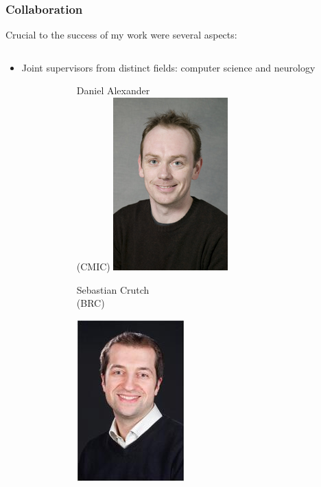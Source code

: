 \documentclass[10pt,xcolor=table]{beamer}
\begin{document}
\begin{frame}
\frametitle{Collaboration}

Crucial to the success of my work were several aspects:

\begin{small}
\begin{columns}[T]
    \begin{column}{.47\textwidth}

     \begin{itemize}
      \item Joint supervisors from distinct fields: computer science and neurology
      \begin{figure}
      \begin{subfigure}{0.42\textwidth}
      \centering
      Daniel Alexander\\
      (CMIC)
      \includegraphics[scale=0.25]{Danny-Alexander.jpeg}  
      \end{subfigure}\hspace{0.5em}\begin{subfigure}{0.42\textwidth}
	\centering
	Sebastian Crutch\\
	(BRC)
	
      \includegraphics[scale=0.27]{Seb_Crutch_photo.JPG}  
      \end{subfigure}
     \end{figure}
  

\end{itemize}
\end{column}
\end{columns}
\end{small}
\end{frame}
\end{document}
